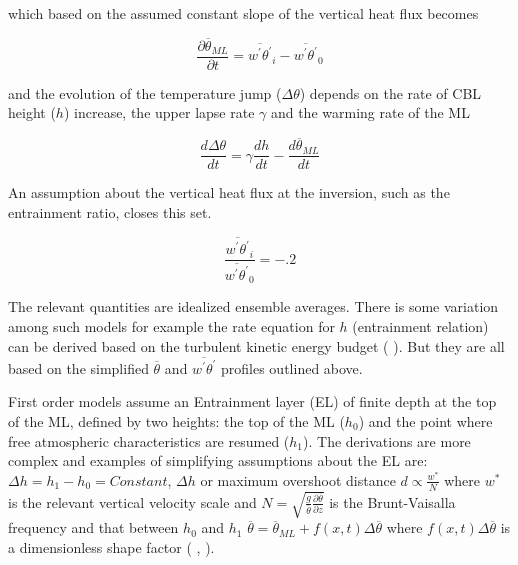 which based on the assumed constant slope of the vertical heat flux becomes

\begin{equation}
\frac{\partial \overline{\theta}_{ML}}{\partial t} = \overline{w^{'}\theta^{'}}_{i}-\overline{w^{'}\theta^{'}}_{0}
\end{equation}

and the evolution of the temperature jump ($\Delta \theta$) depends on the rate of \acs{CBL} height ($h$) increase, 
the upper lapse rate $\gamma$ and the warming rate of the \acs{ML}
  
\begin{equation}
\frac{d\Delta \theta}{dt} = \gamma\frac{dh}{dt} - \frac{d\overline{\theta}_{ML}}{dt}
\end{equation}

An assumption about the vertical heat flux at the inversion, such as the entrainment ratio, closes this set.

\begin{equation}
\frac{\overline{w^{'}\theta^{'}}_{i}}{\overline{w^{'}\theta^{'}}_{0}} = -.2
\end{equation}


\citeauthor{Tennekes73} \cite{Tennekes73}

The relevant quantities are idealized ensemble averages. There is some variation among such models for example the rate equation for 
$h$ (entrainment relation) can be derived based on the turbulent kinetic energy budget (\citeauthor{FedConzMir04} \cite{FedConzMir04}).
But they are all based on the simplified $\overline{\theta}$ and $\overline{w^{'}\theta^{'}}$ profiles outlined above.  

First order models assume an Entrainment layer (\acs{EL}) of finite depth at the top of the ML, defined by two heights:
the top of the ML ($h_{0}$) and the point where free atmospheric characteristics are resumed ($h_{1}$).  The derivations are more complex and 
examples of simplifying assumptions about the \acs{EL} are: $\Delta h = h_{1} - h_{0} = Constant$, $\Delta h$ or maximum 
overshoot distance $d \propto \frac{w^{*}}{N}$ where $w^{*}$ is the relevant vertical velocity scale and $N = \sqrt{\frac{g}{\overline{\theta}} \frac{\partial \overline{\theta}}{\partial z}}$ is the Brunt-Vaisalla frequency  and that between $h_{0}$ and $h_{1}$ $\overline{\theta} = \overline{\theta}_{ML} + f(x,t) \Delta \overline{\theta}$ where $f(x,t) \Delta \overline{\theta}$ is a dimensionless shape factor (\citeauthor{Deardorff79} \cite{Deardorff79}, \citeauthor{Stull73} \cite{Stull73}).\\

